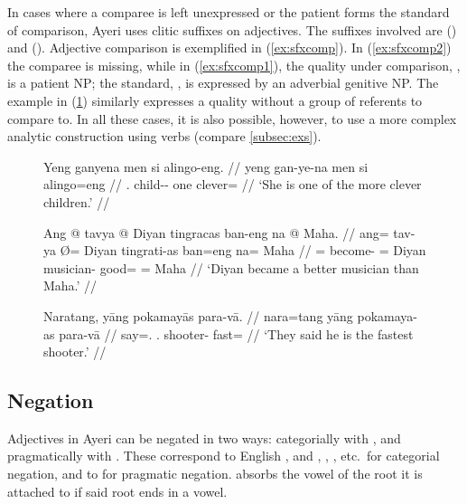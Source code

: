 In cases where a comparee is left unexpressed or the patient forms the standard
of comparison, Ayeri uses clitic suffixes on adjectives. The suffixes involved
are  (\Comp{}) and  (\Supl{}). Adjective
comparison is exemplified in (\ref{ex:sfxcomp}). In (\ref{ex:sfxcomp2}) the
comparee is missing, while in (\ref{ex:sfxcomp1}), the quality under
comparison, ,
is a patient NP; the standard, , is expressed by an adverbial
genitive NP. The example in (\ref{ex:sfxsupl}) similarly expresses a quality
without a group of referents to compare to. In all these cases, it is also
possible, however, to use a more complex analytic construction using verbs
(compare \autoref{subsec:exs}).

\begin{figure}[h]
\pex\label{ex:sfxcomp}
\a\label{ex:sfxcomp2}\begingl
	\gla Yeng ganyena men si alingo-eng. //
	\glb yeng gan-ye-na men si alingo=eng //
	\glc \TsgF{}.\Aarg{} child-\Pl{}-\Gen{} one \Rel{} clever=\Comp{} //
	\glft `She is one of the more clever children.' //
\endgl

\a\label{ex:sfxcomp1}\begingl
	\gla Ang @ tavya {} @ Diyan tingracas ban-eng na @ Maha. //
	\glb ang= tav-ya Ø= Diyan tingrati-as ban=eng na= Maha //
	\glc \AgtT{}= become-\TsgM{} \Top{}= Diyan musician-\Parg{} good=\Comp{} 
		\Gen{}= Maha //
	\glft `Diyan became a better musician than Maha.' //
\endgl


\a\label{ex:sfxsupl}\begingl
	\gla Naratang, yāng pokamayās para-vā. //
	\glb nara=tang yāng pokamaya-as para-vā //
	\glc say=\TplM{}.\Aarg{} \TsgM.\Aarg{} shooter-\Parg{} fast=\Supl{} //
	\glft `They said he is the fastest shooter.' //
\endgl
\xe
\end{figure}


\subsection{Negation}
\label{subsec:adjneg}

Adjectives in Ayeri can be negated in two ways: categorially with 
, and pragmatically with . These correspond to
English , and , , , etc.\ for categorial
negation, and to  for pragmatic negation.  absorbs the
vowel of the root it is attached to if said root ends in a vowel.

